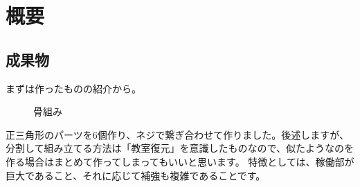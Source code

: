 \documentclass{jsarticle}
\begin{document}
\tableofcontents
\clearpage

\section{概要}
\subsection{成果物}

まずは作ったものの紹介から。

\begin{figure}[h]
    \centering
    \caption[]{骨組み}
    \label{figs:骨組み}
\end{figure}

正三角形のパーツを6個作り、ネジで繋ぎ合わせて作りました。後述しますが、分割して組み立てる方法は「教室復元」を意識したものなので、似たようなのを作る場合はまとめて作ってしまってもいいと思います。
特徴としては、稼働部が巨大であること、それに応じて補強も複雑であることです。
\end{document}
